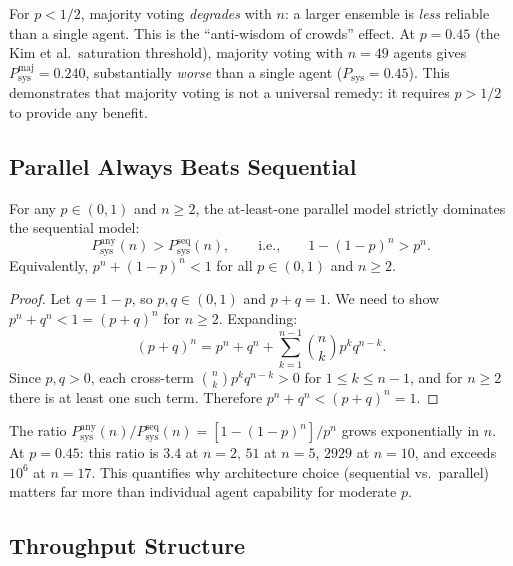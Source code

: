 \begin{remark}
\label{rem:anti-wisdom}
For $p < 1/2$, majority voting \emph{degrades} with $n$: a larger ensemble is
\emph{less} reliable than a single agent. This is the ``anti-wisdom of crowds'' effect.
At $p = 0.45$ (the Kim et al.\ saturation threshold), majority voting with $n = 49$
agents gives $P_{\mathrm{sys}}^{\mathrm{maj}} = 0.240$, substantially \emph{worse} than
a single agent ($P_{\mathrm{sys}} = 0.45$). This demonstrates that majority voting
is not a universal remedy: it requires $p > 1/2$ to provide any benefit.
\end{remark}

\subsection{Parallel Always Beats Sequential}

\begin{theorem}
\label{thm:parallel-dominance}
For any $p \in (0,1)$ and $n \ge 2$, the at-least-one parallel model strictly dominates
the sequential model:
\[
  P_{\mathrm{sys}}^{\mathrm{any}}(n) > P_{\mathrm{sys}}^{\mathrm{seq}}(n),
  \qquad\text{i.e.,}\qquad
  1 - (1-p)^n > p^n.
\]
Equivalently, $p^n + (1-p)^n < 1$ for all $p \in (0,1)$ and $n \ge 2$.
\end{theorem}

\begin{proof}
Let $q = 1 - p$, so $p, q \in (0,1)$ and $p + q = 1$. We need to show
$p^n + q^n < 1 = (p + q)^n$ for $n \ge 2$. Expanding:
\[
  (p+q)^n = p^n + q^n + \sum_{k=1}^{n-1} \binom{n}{k} p^k q^{n-k}.
\]
Since $p, q > 0$, each cross-term $\binom{n}{k} p^k q^{n-k} > 0$ for $1 \le k \le n-1$,
and for $n \ge 2$ there is at least one such term. Therefore
$p^n + q^n < (p+q)^n = 1$.
\end{proof}

\begin{remark}
The ratio $P_{\mathrm{sys}}^{\mathrm{any}}(n) / P_{\mathrm{sys}}^{\mathrm{seq}}(n)
= [1-(1-p)^n]/p^n$ grows exponentially in $n$. At $p = 0.45$: this ratio is $3.4$
at $n=2$, $51$ at $n=5$, $2929$ at $n=10$, and exceeds $10^6$ at $n=17$.
This quantifies why architecture choice (sequential vs.\ parallel) matters far more
than individual agent capability for moderate $p$.
\end{remark}

\subsection{Throughput Structure}

